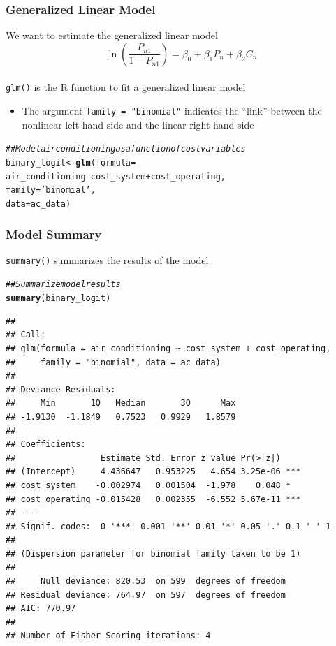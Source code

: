 \documentclass{beamer}\usepackage[]{graphicx}\usepackage[]{xcolor}
\makeatletter
\newcommand{\hlstr}[1]{\textcolor[rgb]{0.192,0.494,0.8}{#1}}%
\newcommand{\hlcom}[1]{\textcolor[rgb]{0.678,0.584,0.686}{\textit{#1}}}%
\newcommand{\hlopt}[1]{\textcolor[rgb]{0,0,0}{#1}}%
\newcommand{\hlstd}[1]{\textcolor[rgb]{0.345,0.345,0.345}{#1}}%
\newcommand{\hlkwb}[1]{\textcolor[rgb]{0.69,0.353,0.396}{#1}}%
\newcommand{\hlkwc}[1]{\textcolor[rgb]{0.333,0.667,0.333}{#1}}%
\newcommand{\hlkwd}[1]{\textcolor[rgb]{0.737,0.353,0.396}{\textbf{#1}}}%
\newenvironment{kframe}{%
 \def\at@end@of@kframe{}%
 \ifinner\ifhmode%
  \def\at@end@of@kframe{\end{minipage}}%
  \begin{minipage}{\columnwidth}%
 \fi\fi%
 \def\FrameCommand##1{\hskip\@totalleftmargin \hskip-\fboxsep
 \colorbox{shadecolor}{##1}\hskip-\fboxsep
     \hskip-\linewidth \hskip-\@totalleftmargin \hskip\columnwidth}%
 \MakeFramed {\advance\hsize-\width
   \@totalleftmargin\z@ \linewidth\hsize
   \@setminipage}}%
 {\par\unskip\endMakeFramed%
 \at@end@of@kframe}
\newenvironment{knitrout}{}{} %
\makeatother
\begin{document}
\begin{frame}[fragile]\frametitle{Generalized Linear Model}
    We want to estimate the generalized linear model
    $$\ln \left( \frac{P_{n1}}{1 - P_{n1}} \right) = \beta_0 + \beta_1 P_n + \beta_2 C_n$$ \\
    \vspace{3ex}
    \texttt{glm()} is the R function to fit a generalized linear model
    \begin{itemize}
        \item The argument \texttt{family = "binomial"} indicates the ``link'' between the nonlinear left-hand side and the linear right-hand side
    \end{itemize}
\begin{knitrout}\footnotesize
{}\color{fgcolor}\begin{kframe}
\begin{alltt}
\hlcom{## Model air conditioning as a function of cost variables}
\hlstd{binary_logit} \hlkwb{<-} \hlkwd{glm}\hlstd{(}\hlkwc{formula} \hlstd{=}
                      \hlstd{air_conditioning} \hlopt{~} \hlstd{cost_system} \hlopt{+} \hlstd{cost_operating,}
                    \hlkwc{family} \hlstd{=} \hlstr{'binomial'}\hlstd{,}
                    \hlkwc{data} \hlstd{= ac_data)}
\end{alltt}
\end{kframe}
\end{knitrout}
\end{frame}

\begin{frame}[fragile]\frametitle{Model Summary}
    \texttt{summary()} summarizes the results of the model
    \vspace{1ex}
\begin{knitrout}\tiny
{}\color{fgcolor}\begin{kframe}
\begin{alltt}
\hlcom{## Summarize model results}
\hlkwd{summary}\hlstd{(binary_logit)}
\end{alltt}
\begin{verbatim}
## 
## Call:
## glm(formula = air_conditioning ~ cost_system + cost_operating, 
##     family = "binomial", data = ac_data)
## 
## Deviance Residuals: 
##     Min       1Q   Median       3Q      Max  
## -1.9130  -1.1849   0.7523   0.9929   1.8579  
## 
## Coefficients:
##                 Estimate Std. Error z value Pr(>|z|)    
## (Intercept)     4.436647   0.953225   4.654 3.25e-06 ***
## cost_system    -0.002974   0.001504  -1.978    0.048 *  
## cost_operating -0.015428   0.002355  -6.552 5.67e-11 ***
## ---
## Signif. codes:  0 '***' 0.001 '**' 0.01 '*' 0.05 '.' 0.1 ' ' 1
## 
## (Dispersion parameter for binomial family taken to be 1)
## 
##     Null deviance: 820.53  on 599  degrees of freedom
## Residual deviance: 764.97  on 597  degrees of freedom
## AIC: 770.97
## 
## Number of Fisher Scoring iterations: 4
\end{verbatim}
\end{kframe}
\end{knitrout}
\end{frame}
\end{document}
